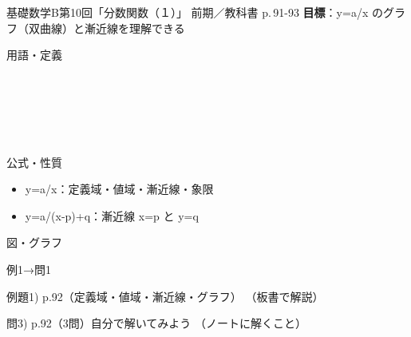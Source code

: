 \documentclass[aspectratio=43,professionalfonts,handout]{beamer}
\newcommand{\LectureNum}{10}
\newcommand{\LectureTitle}{分数関数（１）}
\newcommand{\TextPages}{p.\,91-93}
\newcommand{\CourseName}{基礎数学B}
\renewcommand{\TermName}{前期}
\begin{document}
\begin{frame}{\CourseName\quad 第\LectureNum 回「\LectureTitle 」}
  {\small \TermName\quad \TeacherName\quad ／\quad 教科書 \TextPages\quad
  \textbf{目標}：y=a/x のグラフ（双曲線）と漸近線を理解できる}

  \begin{block}{用語・定義}
  \begin{description}[labelwidth=5.5em]
    \item[\kw{分数関数}] ~
    \item[\kw{双曲線}] ~
    \item[\kw{漸近線}] ~
  \end{description}
  \end{block}
\end{frame}

\begin{frame}{公式・性質}
  \begin{block}{}
  \begin{itemize}
    \item y=a/x：定義域・値域・漸近線・象限
    \item y=a/(x-p)+q：漸近線 x=p と y=q
  \end{itemize}
  \end{block}
\end{frame}

\begin{frame}{図・グラフ}
  \centering
\end{frame}

\begin{frame}{例1→問1}
  \begin{exampleblock}{例題1) p.92（定義域・値域・漸近線・グラフ）}
    （板書で解説）
  \end{exampleblock}

  \vfill

  \begin{block}{問3) p.92（3問）\quad 自分で解いてみよう}
    （ノートに解くこと）
  \end{block}
\end{frame}
\end{document}
